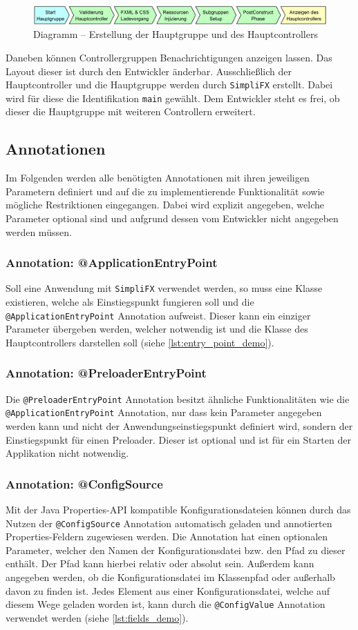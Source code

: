 \begin{figure}[H]
	\centering
	\includegraphics[width=\textwidth]{Abbildungen/Controller Erstellungsprozess.png}
	\caption{Diagramm -- Erstellung der Hauptgruppe und des Hauptcontrollers}
	\label{fig:controller_init}
\end{figure}
\noindent Daneben können Controllergruppen Benachrichtigungen anzeigen lassen. Das Layout dieser ist durch den Entwickler änderbar. Ausschließlich der Hauptcontroller und die Hauptgruppe werden durch \texttt{SimpliFX} erstellt. Dabei wird für diese die Identifikation \texttt{main} gewählt. Dem Entwickler steht es frei, ob dieser die Hauptgruppe mit weiteren Controllern erweitert.
\subsection{Annotationen}
\label{annotations}
Im Folgenden werden alle benötigten Annotationen mit ihren jeweiligen Parametern definiert und auf die zu implementierende Funktionalität sowie mögliche Restriktionen eingegangen. Dabei wird explizit angegeben, welche Parameter optional sind und aufgrund dessen vom Entwickler nicht angegeben werden müssen.
\subsubsection{Annotation: @ApplicationEntryPoint}
Soll eine Anwendung mit \texttt{SimpliFX} verwendet werden, so muss eine Klasse existieren, welche als Einstiegspunkt fungieren soll und die \texttt{@ApplicationEntryPoint} Annotation aufweist. Dieser kann ein einziger Parameter übergeben werden, welcher notwendig ist und die Klasse des Hauptcontrollers darstellen soll (siehe \autoref{lst:entry_point_demo}).
\subsubsection{Annotation: @PreloaderEntryPoint}
Die \texttt{@PreloaderEntryPoint} Annotation besitzt ähnliche Funktionalitäten wie die \texttt{@ApplicationEntryPoint} Annotation, nur dass kein Parameter angegeben werden kann und nicht der Anwendungseinstiegspunkt definiert wird, sondern der Einstiegspunkt für einen Preloader. Dieser ist optional und ist für ein Starten der Applikation nicht notwendig.
\subsubsection{Annotation: @ConfigSource}
Mit der Java Properties-API kompatible Konfigurationsdateien können durch das Nutzen der \texttt{@ConfigSource} Annotation automatisch geladen und annotierten Properties-Feldern zugewiesen werden. Die Annotation hat einen optionalen Parameter, welcher den Namen der Konfigurationsdatei bzw. den Pfad zu dieser enthält. Der Pfad kann hierbei relativ oder absolut sein. Außerdem kann angegeben werden, ob die Konfigurationsdatei im Klassenpfad oder außerhalb davon zu finden ist. Jedes Element aus einer Konfigurationsdatei, welche auf diesem Wege geladen worden ist, kann durch die \texttt{@ConfigValue} Annotation verwendet werden (siehe \autoref{lst:fields_demo}).
